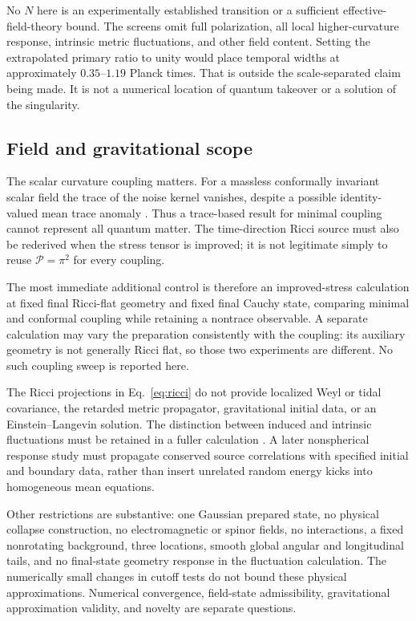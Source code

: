 \documentclass[aps,prd,reprint,floatfix,nofootinbib,longbibliography]{revtex4-2}
\newcommand{\Pp}{\mathcal{P}}
\begin{document}
No $N$ here is an experimentally established transition or a sufficient effective-field-theory bound. The screens omit full polarization, all local higher-curvature response, intrinsic metric fluctuations, and other field content. Setting the extrapolated primary ratio to unity would place temporal widths at approximately $0.35$--$1.19$ Planck times. That is outside the scale-separated claim being made. It is not a numerical location of quantum takeover or a solution of the singularity.

\subsection{Field and gravitational scope}
The scalar curvature coupling matters. For a massless conformally invariant scalar field the trace of the noise kernel vanishes, despite a possible identity-valued mean trace anomaly \cite{PhillipsHu2001}. Thus a trace-based result for minimal coupling cannot represent all quantum matter. The time-direction Ricci source must also be rederived when the stress tensor is improved; it is not legitimate simply to reuse $\Pp=\pi^2$ for every coupling.

The most immediate additional control is therefore an improved-stress calculation at fixed final Ricci-flat geometry and fixed final Cauchy state, comparing minimal and conformal coupling while retaining a nontrace observable. A separate calculation may vary the preparation consistently with the coupling: its auxiliary geometry is not generally Ricci flat, so those two experiments are different. No such coupling sweep is reported here.

The Ricci projections in Eq.~\eqref{eq:ricci} do not provide localized Weyl or tidal covariance, the retarded metric propagator, gravitational initial data, or an Einstein--Langevin solution. The distinction between induced and intrinsic fluctuations must be retained in a fuller calculation \cite{HuRouraVerdaguer2004}. A later nonspherical response study must propagate conserved source correlations with specified initial and boundary data, rather than insert unrelated random energy kicks into homogeneous mean equations.

Other restrictions are substantive: one Gaussian prepared state, no physical collapse construction, no electromagnetic or spinor fields, no interactions, a fixed nonrotating background, three locations, smooth global angular and longitudinal tails, and no final-state geometry response in the fluctuation calculation. The numerically small changes in cutoff tests do not bound these physical approximations. Numerical convergence, field-state admissibility, gravitational approximation validity, and novelty are separate questions.
\end{document}
